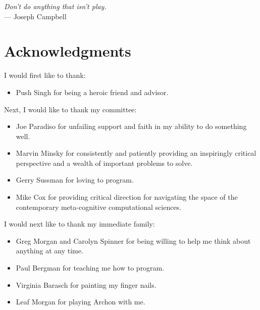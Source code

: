 



\begin{flushright}{\slshape    
Don't do anything that isn't play.} \\ \medskip
    --- Joseph Campbell
\end{flushright}



\bigskip

\begingroup
\let\clearpage\relax
\let\cleardoublepage\relax
\let\cleardoublepage\relax
\chapter*{Acknowledgments}

I would first like to thank:
\begin{itemize}
\item{Push Singh for being a heroic friend and advisor.}
\end{itemize}

\vspace{5mm}

Next, I would like to thank my committee:
\begin{itemize}
\item{Joe Paradiso for unfailing support and faith in my ability to do
  something well.}
\item{Marvin Minsky for consistently and patiently providing an
  inspiringly critical perspective and a wealth of important problems
  to solve.}
\item{Gerry Sussman for loving to program.}
\item{Mike Cox for providing critical direction for navigating the
  space of the contemporary meta-cognitive computational sciences.}
\end{itemize}

\vspace{5mm}

I would next like to thank my immediate family:
\begin{itemize}
\item{Greg Morgan and Carolyn Spinner for being willing to help me think about anything at any time.}
\item{Paul Bergman for teaching me how to program.}
\item{Virginia Barasch for painting my finger nails.}
\item{Leaf Morgan for playing Archon with me.}
\end{itemize}

